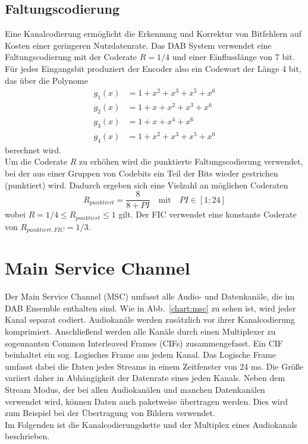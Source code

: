 \subsection{Faltungscodierung}
\label{sec:faltungscodierung}
Eine Kanalcodierung ermöglicht die Erkennung und Korrektur von Bitfehlern auf Kosten einer geringeren Nutzdatenrate. Das DAB System verwendet eine Faltungscodierung mit der Coderate $R=1/4$ und einer Einflusslänge von 7 bit. Für jedes Eingangsbit produziert der Encoder also ein Codewort der Länge 4 bit, das über die Polynome
\begin{equation}
\begin{aligned}
g_1(x) &= 1 + x^2 + x^3 + x^5 + x^6 \\
g_2(x) &= 1 + x + x^2 + x^3 + x^6 \\
g_3(x) &= 1 + x + x^4 + x^6 \\
g_4(x) &= 1 + x^2 + x^3 + x^5 + x^6
\end{aligned}
\end{equation}
berechnet wird. \\
Um die Coderate $R$ zu erhöhen wird die punktierte Faltungscodierung verwendet, bei der aus einer Gruppen von Codebits ein Teil der Bits wieder gestrichen (punktiert) wird. Dadurch ergeben sich eine Vielzahl an möglichen Coderaten
\begin{equation}
R_{punktiert} = \frac{8}{8 + PI} \quad \text{mit} \quad PI \in [1;24]
\end{equation}
wobei $R = 1/4 \leq R_{punktiert} \leq 1$ gilt. Der FIC verwendet eine konstante Coderate von $R_{punktiert, FIC} = 1/3$.

\section{Main Service Channel}
Der Main Service Channel (MSC) umfasst alle Audio- und Datenkanäle, die im DAB Ensemble enthalten sind. Wie in Abb.~\ref{chart:msc} zu sehen ist, wird jeder Kanal separat codiert. Audiokanäle werden zusätzlich vor ihrer Kanalcodierung komprimiert. Anschließend werden alle Kanäle durch einen Multiplexer zu sogennanten Common Interleaved Frames (CIFs) zusammengefasst. Ein CIF beinhaltet ein sog. Logisches Frame aus jedem Kanal. Das Logische Frame umfasst dabei die Daten jedes Streams in einem Zeitfenster von 24 ms. Die Größe variiert daher in Abhängigkeit der Datenrate eines jeden Kanals. Neben dem Stream Modus, der bei allen Audiokanälen und manchen Datenkanälen verwendet wird, können Daten auch paketweise übertragen werden. Dies wird zum Beispiel bei der Übertragung von Bildern verwendet.\\
Im Folgenden ist die Kanalcodierungskette und der Multiplex eines Audiokanals beschrieben.

